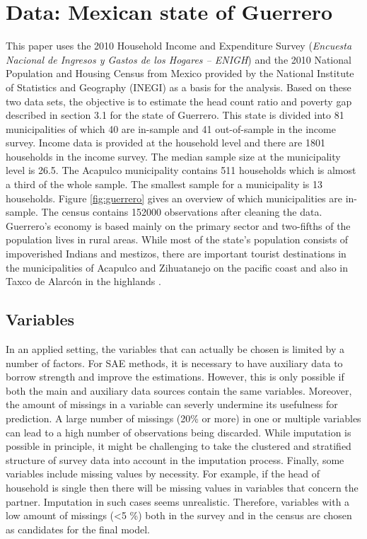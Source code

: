 \chapter{Data: Mexican state of Guerrero}

This paper uses the 2010 Household Income and Expenditure Survey (\textit{Encuesta Nacional de Ingresos y Gastos de los Hogares – ENIGH}) and the 2010 National Population and Housing Census from Mexico provided by the National Institute of Statistics and Geography (INEGI) as a basis for the analysis.
Based on these two data sets, the objective is to estimate the head count ratio and poverty gap described in section 3.1 for the state of Guerrero.
This state is divided into 81 municipalities of which 40 are in-sample and 41 out-of-sample in the income survey.
Income data is provided at the household level and there are 1801 households in the income survey.
The median sample size at the municipality level is 26.5.
The Acapulco municipality contains 511 households which is almost a third of the whole sample.
The smallest sample for a municipality is 13 households.
Figure \ref{fig:guerrero} gives an overview of which municipalities are in-sample.
The census contains 152000 observations after cleaning the data.
Guerrero's economy is based mainly on the primary sector and two-fifths of the population lives in rural areas.
While most of the state's population consists of impoverished Indians and mestizos, there are important tourist destinations in the municipalities of Acapulco and Zihuatanejo on the pacific coast and also in Taxco de Alarcón in the highlands \citep{encyclopaedia_britannica_guerrero_2019}.

\section{Variables}

In an applied setting, the variables that can actually be chosen is limited by a number of factors.
For SAE methods, it is necessary to have auxiliary data to borrow strength and improve the estimations.
However, this is only possible if both the main and auxiliary data sources contain the same variables.
Moreover, the amount of missings in a variable can severly undermine its usefulness for prediction.
A large number of missings (20\% or more) in one or multiple variables can lead to a high number of observations being discarded.
While imputation is possible in principle, it might be challenging to take the clustered and stratified structure of survey data into account in the imputation process.
Finally, some variables include missing values by necessity.
For example, if the head of household is single then there will be missing values in variables that concern the partner.
Imputation in such cases seems unrealistic.
Therefore, variables with a low amount of missings (<5 \%) both in the survey and in the census are chosen as candidates for the final model.

